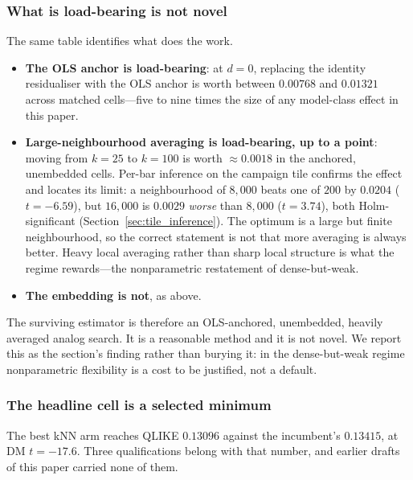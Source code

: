 \subsubsection{What is load-bearing is not novel}

The same table identifies what does the work.

\begin{itemize}
  \item \textbf{The OLS anchor is load-bearing}: at $d = 0$, replacing the
    identity residualiser with the OLS anchor is worth between $0.00768$ and
    $0.01321$ across matched cells---five to nine times the size of any
    model-class effect in this paper.
  \item \textbf{Large-neighbourhood averaging is load-bearing, up to a point}:
    moving from $k = 25$ to $k = 100$ is worth $\approx 0.0018$ in the anchored,
    unembedded cells. Per-bar inference on the campaign tile confirms the effect
    and locates its limit: a neighbourhood of $8{,}000$ beats one of $200$ by
    $0.0204$ ($t = -6.59$), but $16{,}000$ is $0.0029$ \emph{worse} than
    $8{,}000$ ($t = 3.74$), both Holm-significant
    (Section~\ref{sec:tile_inference}). The optimum is a large but finite
    neighbourhood, so the correct statement is not that more averaging is
    always better. Heavy local averaging rather than sharp local structure is
    what the regime rewards---the nonparametric restatement of dense-but-weak.
  \item \textbf{The embedding is not}, as above.
\end{itemize}

The surviving estimator is therefore an OLS-anchored, unembedded, heavily
averaged analog search. It is a reasonable method and it is not novel. We
report this as the section's finding rather than burying it: in the
dense-but-weak regime nonparametric flexibility is a cost to be justified, not
a default.

\subsubsection{The headline cell is a selected minimum}
\label{sec:knn_selection}

The best kNN arm reaches QLIKE $0.13096$ against the incumbent's $0.13415$, at
DM $t = -17.6$. Three qualifications belong with that number, and earlier
drafts of this paper carried none of them.

